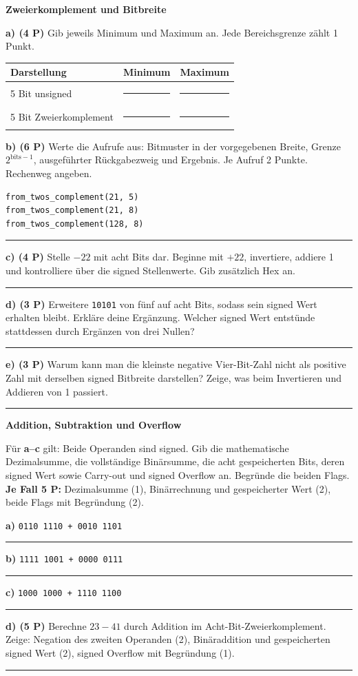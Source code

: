 \documentclass[10pt,a4paper]{article}
\newcommand{\titlepagepart}[2]{\vspace*{-4mm}{\sffamily\small #1}\par{\sffamily\LARGE\bfseries #2}\par\vspace{2mm}}
\newcommand{\block}[1]{\par\vspace{2mm}{\sffamily\large\bfseries #1}\par}
\newcommand{\code}[1]{\texttt{#1}}
\newcommand{\antwort}[1]{\par\vspace{#1}\hrule\vspace{2mm}}
\newcommand{\aufgabe}[2]{\block{#1 \hfill #2 Punkte}}
\begin{document}
\newpage
\titlepagepart{02 / DARSTELLUNGEN}{Zweierkomplement und Bitbreite}
\aufgabe{3. Zahlenbereiche und Interpretationen}{20}
\textbf{a) (4 P)} Gib jeweils Minimum und Maximum an. Jede Bereichsgrenze zählt
1 Punkt.\par
\begin{center}
\begin{tabular}{lcc}\toprule
Darstellung&Minimum&Maximum\\\midrule
5 Bit unsigned&\rule{35mm}{0.2pt}&\rule{35mm}{0.2pt}\\[5mm]
5 Bit Zweierkomplement&\rule{35mm}{0.2pt}&\rule{35mm}{0.2pt}\\\bottomrule
\end{tabular}
\end{center}
\textbf{b) (6 P)} Werte die Aufrufe aus: Bitmuster in der vorgegebenen Breite,
Grenze $2^{\mathrm{bits}-1}$, ausgeführter Rückgabezweig und Ergebnis.
Je Aufruf 2 Punkte. Rechenweg angeben.
\begin{lstlisting}
from_twos_complement(21, 5)
from_twos_complement(21, 8)
from_twos_complement(128, 8)
\end{lstlisting}
\antwort{34mm}
\textbf{c) (4 P)} Stelle $-22$ mit acht Bits dar. Beginne mit $+22$, invertiere,
addiere 1 und kontrolliere über die signed Stellenwerte. Gib zusätzlich Hex an.
\antwort{28mm}
\textbf{d) (3 P)} Erweitere \code{10101} von fünf auf acht Bits, sodass sein
signed Wert erhalten bleibt. Erkläre deine Ergänzung. Welcher signed Wert
entstünde stattdessen durch Ergänzen von drei Nullen?
\antwort{23mm}
\textbf{e) (3 P)} Warum kann man die kleinste negative Vier-Bit-Zahl nicht als
positive Zahl mit derselben signed Bitbreite darstellen? Zeige, was beim
Invertieren und Addieren von 1 passiert.
\antwort{22mm}

\newpage
\titlepagepart{03 / RECHNEN}{Addition, Subtraktion und Overflow}
\aufgabe{4. Die Hardware rechnet mit acht Bits}{20}
Für \textbf{a--c} gilt: Beide Operanden sind signed. Gib die mathematische
Dezimalsumme, die vollständige Binärsumme, die acht gespeicherten Bits, deren
signed Wert sowie Carry-out und signed Overflow an. Begründe die beiden Flags.
\textbf{Je Fall 5 P:} Dezimalsumme (1), Binärrechnung und gespeicherter Wert (2),
beide Flags mit Begründung (2).

\textbf{a)} \code{0110 1110 + 0010 1101}
\antwort{38mm}
\textbf{b)} \code{1111 1001 + 0000 0111}
\antwort{38mm}
\textbf{c)} \code{1000 1000 + 1110 1100}
\antwort{38mm}
\textbf{d) (5 P)} Berechne $23-41$ durch Addition im Acht-Bit-Zweierkomplement.
Zeige: Negation des zweiten Operanden (2), Binäraddition und gespeicherten
signed Wert (2), signed Overflow mit Begründung (1).
\antwort{35mm}
\end{document}
